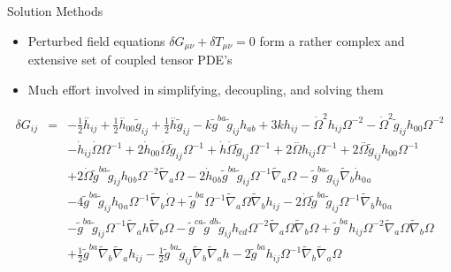 \documentclass[8pt,aspectratio=1610]{beamer}
\begin{document}

\begin{frame}{Solution Methods}
	\begin{itemize}
		\item Perturbed field equations $\delta G_{\mu\nu} + \delta T_{\mu\nu} = 0$ form a rather complex and extensive set of coupled tensor PDE's
		\item
		Much effort involved in simplifying, decoupling, and solving them
	\end{itemize}
	\begin{eqnarray}
		\delta G_{ij} &=& - \tfrac{1}{2} \overset{..}{h}_{ij} + \tfrac{1}{2} \overset{..}{h}_{00}{} \tilde{g}_{ij} + \tfrac{1}{2} \overset{..}{h} \tilde{g}_{ij} -  k \tilde{g}^{ba} \tilde{g}_{ij} h_{ab} + 3 k h_{ij} -  \dot{\Omega}^2 h_{ij} \Omega^{-2} -  \dot{\Omega}^2 \tilde{g}_{ij} h_{00}{} \Omega^{-2} 
		\nonumber\\
		&& -  \dot{h}_{ij} \dot{\Omega} \Omega^{-1}  + 2 \dot{h}_{00}{} \dot{\Omega} \tilde{g}_{ij} \Omega^{-1} + \dot{h} \dot{\Omega} \tilde{g}_{ij} \Omega^{-1} + 2 \overset{..}{\Omega} h_{ij} \Omega^{-1} + 2 \overset{..}{\Omega} \tilde{g}_{ij} h_{00}{} \Omega^{-1} 
		\nonumber\\
		&& + 2 \dot{\Omega} \tilde{g}^{ba} \tilde{g}_{ij} h_{0}{}_{b} \Omega^{-2} \tilde{\nabla}_{a}\Omega  - 2 \dot{h}_{0}{}_{b} \tilde{g}^{ba} \tilde{g}_{ij} \Omega^{-1} \tilde{\nabla}_{a}\Omega -  \tilde{g}^{ba} \tilde{g}_{ij} \tilde{\nabla}_{b}\dot{h}_{0}{}_{a} 
		\nonumber\\
		&& - 4 \tilde{g}^{ba} \tilde{g}_{ij} h_{0}{}_{a} \Omega^{-1} \tilde{\nabla}_{b}\dot{\Omega} + \tilde{g}^{ba} \Omega^{-1} \tilde{\nabla}_{a}\Omega \tilde{\nabla}_{b}h_{ij} - 2 \dot{\Omega} \tilde{g}^{ba} \tilde{g}_{ij} \Omega^{-1} \tilde{\nabla}_{b}h_{0}{}_{a}
		\nonumber\\
		&&  -  \tilde{g}^{ba} \tilde{g}_{ij} \Omega^{-1} \tilde{\nabla}_{a}h \tilde{\nabla}_{b}\Omega -  \tilde{g}^{ca} \tilde{g}^{db} \tilde{g}_{ij} h_{cd} \Omega^{-2} \tilde{\nabla}_{a}\Omega \tilde{\nabla}_{b}\Omega  + \tilde{g}^{ba} h_{ij} \Omega^{-2} \tilde{\nabla}_{a}\Omega \tilde{\nabla}_{b}\Omega 
		\nonumber\\
		&&+ \tfrac{1}{2} \tilde{g}^{ba} \tilde{\nabla}_{b}\tilde{\nabla}_{a}h_{ij} -  \tfrac{1}{2} \tilde{g}^{ba} \tilde{g}_{ij} \tilde{\nabla}_{b}\tilde{\nabla}_{a}h - 2 \tilde{g}^{ba} h_{ij} \Omega^{-1} \tilde{\nabla}_{b}\tilde{\nabla}_{a}\Omega  

\end{eqnarray}
\end{frame}
\end{document}

